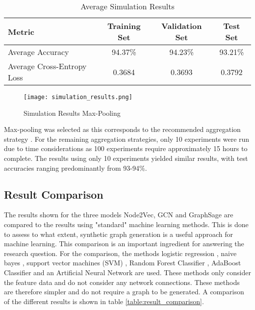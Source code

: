   \begin{table}[h]
    \centering
      \begin{tabular}{|l||c|c|c|}
      \hline
      \textbf{Metric} & \textbf{Training Set} & \textbf{Validation Set} & 
      \textbf{Test Set}\\
      \hline\hline
      Average Accuracy & 94.37\% & 94.23\% & 93.21\% \\\hline 
      Average Cross-Entropy Loss & 0.3684 & 0.3693 & 0.3792 \\
      \hline
      \end{tabular}
    \caption{Average Simulation Results}
    \label{table:simulation_results}
  \end{table}

  \begin{figure}[h]
		\centering
		\texttt{[image: simulation\_results.png]}
		\caption{Simulation Results Max-Pooling}
        \label{fig:simulation_results}
  \end{figure}

  \noindent Max-pooling was selected as this corresponds to the recommended
  aggregation strategy \citep[p. 9]{hamilton2017inductive}. For the remaining
  aggregation strategies, only 10 experiments were run due to time
  considerations as 100 experiments require approximately 15 hours to complete.
  The results using only 10 experiments yielded similar results, with test
  accuracies ranging predominantly from 93-94\%. 

  \subsection{Result Comparison}

  The results shown for the three models Node2Vec, GCN and GraphSage are
  compared to the results using "standard" machine learning methods. This is
  done to assess to what extent, synthetic graph generation is a useful
  approach for machine learning. This comparison is an important ingredient for
  answering the research question. For the comparison, the methods logistic
  regression \citep{cramer2002origins}, naive bayes \citep{zhang2004bayes},
  support vector machines (SVM) \citep{platt1999probabilistic,chang2011libsvm},
  Random Forest Classifier \citep{breiman2001random}, AdaBoost Classifier
  \citep{freund1997decision,hastie2009multi} and an Artificial Neural Network
  \citep{mcculloch1943logical} are used. These methods only consider the
  feature data and do not consider any network connections. These methods are
  therefore simpler and do not require a graph to be generated. A comparison of
  the different results is shown in table \ref{table:result_comparison}.

